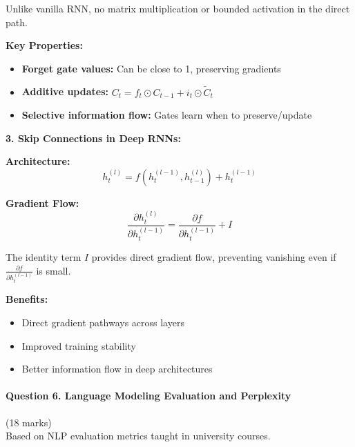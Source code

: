 \documentclass[12pt]{article}
\begin{document}
\begin{enumerate}[(a)]
{    Unlike vanilla RNN, no matrix multiplication or bounded activation in the direct path.
    
    \textbf{Key Properties:}
    \begin{itemize}
        \item \textbf{Forget gate values:} Can be close to 1, preserving gradients
        \item \textbf{Additive updates:} $C_t = f_t \odot C_{t-1} + i_t \odot \tilde{C}_t$
        \item \textbf{Selective information flow:} Gates learn when to preserve/update
    \end{itemize}
    
    \textbf{3. Skip Connections in Deep RNNs:}
    
    \textbf{Architecture:}
    $$h_t^{(l)} = f(h_t^{(l-1)}, h_{t-1}^{(l)}) + h_t^{(l-1)}$$
    
    \textbf{Gradient Flow:}
    $$\frac{\partial h_t^{(l)}}{\partial h_t^{(l-1)}} = \frac{\partial f}{\partial h_t^{(l-1)}} + I$$
    
    The identity term $I$ provides direct gradient flow, preventing vanishing even if $\frac{\partial f}{\partial h_t^{(l-1)}}$ is small.
    
    \textbf{Benefits:}
    \begin{itemize}
        \item Direct gradient pathways across layers
        \item Improved training stability
        \item Better information flow in deep architectures
    \end{itemize}
    }
\end{enumerate}

\newpage
\paragraph{Question 6. Language Modeling Evaluation and Perplexity}\hfill (18 marks)\\
Based on NLP evaluation metrics taught in university courses.
\end{document}
